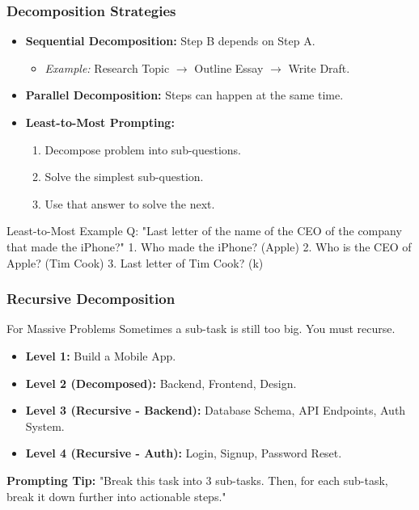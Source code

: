 \documentclass{beamer}
\begin{document}
\begin{frame}
    \frametitle{Decomposition Strategies}
    \begin{itemize}
        \item \textbf{Sequential Decomposition:} Step B depends on Step A.
        \begin{itemize}
            \item \textit{Example:} Research Topic $\to$ Outline Essay $\to$ Write Draft.
        \end{itemize}
        \item \textbf{Parallel Decomposition:} Steps can happen at the same time.
        \item \textbf{Least-to-Most Prompting:}
        \begin{enumerate}
            \item Decompose problem into sub-questions.
            \item Solve the simplest sub-question.
            \item Use that answer to solve the next.
        \end{enumerate}
    \end{itemize}
    \begin{block}{Least-to-Most Example}
        Q: "Last letter of the name of the CEO of the company that made the iPhone?"
        1. Who made the iPhone? (Apple)
        2. Who is the CEO of Apple? (Tim Cook)
        3. Last letter of Tim Cook? (k)
    \end{block}
\end{frame}

\begin{frame}
    \frametitle{Recursive Decomposition}
    \begin{block}{For Massive Problems}
        Sometimes a sub-task is still too big. You must recurse.
    \end{block}
    \begin{itemize}
        \item \textbf{Level 1:} Build a Mobile App.
        \item \textbf{Level 2 (Decomposed):} Backend, Frontend, Design.
        \item \textbf{Level 3 (Recursive - Backend):} Database Schema, API Endpoints, Auth System.
        \item \textbf{Level 4 (Recursive - Auth):} Login, Signup, Password Reset.
    \end{itemize}
    \textbf{Prompting Tip:} "Break this task into 3 sub-tasks. Then, for each sub-task, break it down further into actionable steps."
\end{frame}
\end{document}
